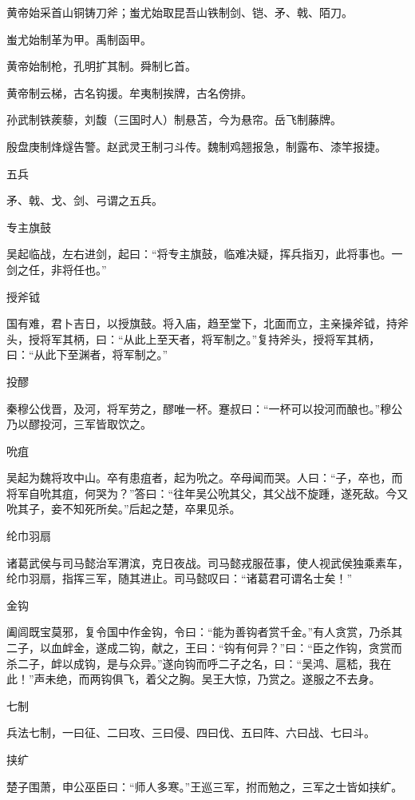 \documentclass[a4paper,12pt,UTF8,twoside]{ctexbook}
\begin{document}
    黄帝始采首山铜铸刀斧；蚩尤始取昆吾山铁制剑、铠、矛、戟、陌刀。
    
    蚩尤始制革为甲。禹制函甲。
    
    黄帝始制枪，孔明扩其制。舜制匕首。
    
    黄帝制云梯，古名钩援。牟夷制挨牌，古名傍排。
    
    孙武制铁蒺藜，刘馥（三国时人）制悬苫，今为悬帘。岳飞制藤牌。
    
    殷盘庚制烽燧告警。赵武灵王制刁斗传。魏制鸡翘报急，制露布、漆竿报捷。
    
    五兵
    
    矛、戟、戈、剑、弓谓之五兵。
    
    专主旗鼓
    
    吴起临战，左右进剑，起曰：“将专主旗鼓，临难决疑，挥兵指刃，此将事也。一剑之任，非将任也。”
    
    授斧钺
    
    国有难，君卜吉日，以授旗鼓。将入庙，趋至堂下，北面而立，主亲操斧钺，持斧头，授将军其柄，曰：“从此上至天者，将军制之。”复持斧头，授将军其柄，曰：“从此下至渊者，将军制之。”
    
    投醪
    
    秦穆公伐晋，及河，将军劳之，醪唯一杯。蹇叔曰：“一杯可以投河而酿也。”穆公乃以醪投河，三军皆取饮之。
    
    吮疽
    
    吴起为魏将攻中山。卒有患疽者，起为吮之。卒母闻而哭。人曰：“子，卒也，而将军自吮其疽，何哭为？”答曰：“往年吴公吮其父，其父战不旋踵，遂死敌。今又吮其子，妾不知死所矣。”后起之楚，卒果见杀。
    
    纶巾羽扇
    
    诸葛武侯与司马懿治军渭滨，克日夜战。司马懿戎服莅事，使人视武侯独乘素车，纶巾羽扇，指挥三军，随其进止。司马懿叹曰：“诸葛君可谓名士矣！”
    
    金钩
    
    阖闾既宝莫邪，复令国中作金钩，令曰：“能为善钩者赏千金。”有人贪赏，乃杀其二子，以血衅金，遂成二钩，献之，王曰：“钩有何异？”曰：“臣之作钩，贪赏而杀二子，衅以成钩，是与众异。”遂向钩而呼二子之名，曰：“吴鸿、扈嵇，我在此！”声未绝，而两钩俱飞，着父之胸。吴王大惊，乃赏之。遂服之不去身。
    
    七制
    
    兵法七制，一曰征、二曰攻、三曰侵、四曰伐、五曰阵、六曰战、七曰斗。
    
    挟纩
    
    楚子围萧，申公巫臣曰：“师人多寒。”王巡三军，拊而勉之，三军之士皆如挟纩。
    
\end{document}
